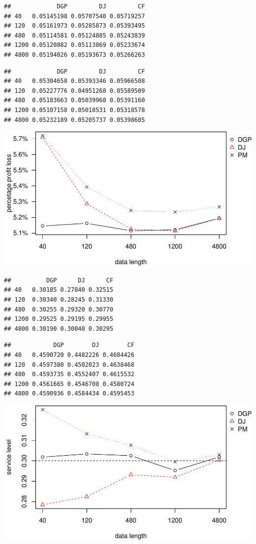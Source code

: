 \documentclass[
]{article}
\begin{document}
\begin{verbatim}
##             DGP         DJ         CF
## 40   0.05145198 0.05707540 0.05719257
## 120  0.05161973 0.05285873 0.05393495
## 480  0.05114581 0.05124885 0.05243839
## 1200 0.05120882 0.05113869 0.05233674
## 4800 0.05194026 0.05193673 0.05266263
\end{verbatim}

\begin{verbatim}
##             DGP         DJ         CF
## 40   0.05304658 0.05393346 0.05966508
## 120  0.05227776 0.04951268 0.05589509
## 480  0.05183663 0.05039968 0.05391160
## 1200 0.05107158 0.05018531 0.05318578
## 4800 0.05232189 0.05205737 0.05398605
\end{verbatim}

\includegraphics{information-plot_files/figure-latex/SAR(3)(1)_4ppl-1.pdf}

\begin{verbatim}
##          DGP      DJ      CF
## 40   0.30185 0.27840 0.32515
## 120  0.30340 0.28245 0.31330
## 480  0.30255 0.29320 0.30770
## 1200 0.29525 0.29195 0.29955
## 4800 0.30190 0.30040 0.30295
\end{verbatim}

\begin{verbatim}
##            DGP        DJ        CF
## 40   0.4590720 0.4482226 0.4684426
## 120  0.4597380 0.4502023 0.4638468
## 480  0.4593735 0.4552407 0.4615532
## 1200 0.4561665 0.4546708 0.4580724
## 4800 0.4590936 0.4584434 0.4595453
\end{verbatim}

\includegraphics{information-plot_files/figure-latex/SAR(3)(1)_4sl-1.pdf}
\end{document}
